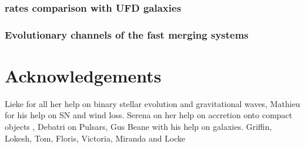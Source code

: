 \documentclass[twocolumn]{aastex63}
\begin{document}
%
\subsubsection{rates comparison with UFD galaxies}
%

%


%
\subsubsection{Evolutionary channels of the fast merging systems}
\label{sec:evolutionchannels}




\section*{Acknowledgements}





Lieke for all her help on binary stellar evolution and gravitational waves, Mathieu for his help on  \ac{SN} and wind loss. 
Serena on her help on accretion onto compact objects , Debatri on Pulsars, Gus Beane with his help on galaxies. 
Griffin, Lokesh, Tom, Floris, Victoria, Miranda and Locke 
\end{document}
